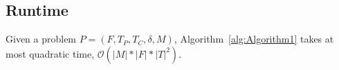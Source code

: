 \documentclass[runningheads]{llncs}
\begin{document}
 
\subsection{Runtime}



\begin{theorem}\label{thm:Runtime}
	Given a problem $P = (F, T_P, T_C, \delta, M)$, Algorithm~\ref{alg:Algorithm1} takes at most quadratic time, $\mathcal{O}( |M| * |F| * |T|^2)$. 
\end{theorem}
\end{document}
